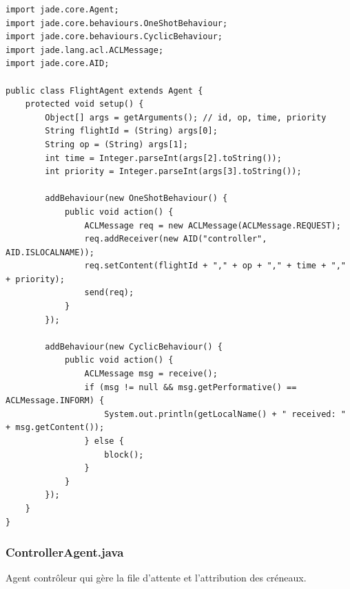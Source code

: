 \documentclass[12pt,a4paper]{article}
\begin{document}
\begin{lstlisting}[caption=FlightAgent.java]
import jade.core.Agent;
import jade.core.behaviours.OneShotBehaviour;
import jade.core.behaviours.CyclicBehaviour;
import jade.lang.acl.ACLMessage;
import jade.core.AID;

public class FlightAgent extends Agent {
    protected void setup() {
        Object[] args = getArguments(); // id, op, time, priority
        String flightId = (String) args[0];
        String op = (String) args[1];
        int time = Integer.parseInt(args[2].toString());
        int priority = Integer.parseInt(args[3].toString());

        addBehaviour(new OneShotBehaviour() {
            public void action() {
                ACLMessage req = new ACLMessage(ACLMessage.REQUEST);
                req.addReceiver(new AID("controller", AID.ISLOCALNAME));
                req.setContent(flightId + "," + op + "," + time + "," + priority);
                send(req);
            }
        });

        addBehaviour(new CyclicBehaviour() {
            public void action() {
                ACLMessage msg = receive();
                if (msg != null && msg.getPerformative() == ACLMessage.INFORM) {
                    System.out.println(getLocalName() + " received: " + msg.getContent());
                } else {
                    block();
                }
            }
        });
    }
}
\end{lstlisting}

\subsubsection{ControllerAgent.java}

Agent contrôleur qui gère la file d'attente et l'attribution des créneaux.
\end{document}
